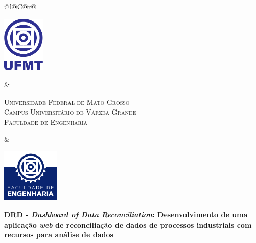 %
%

\begin{titlepage}

\begin{center}

\small

\begin{tabularx}{\linewidth}{@{}l@{}C@{}r@{}}
\parbox[c]{2cm}{\includegraphics[width=2cm]{pre-textuais/figuras/ufmt}} &
\begin{center}
\textsf{\textsc{Universidade Federal de Mato Grosso\\
Campus Universitário de Várzea Grande\\
Faculdade de Engenharia}}
\end{center} &
\parbox[c]{2cm}{\includegraphics[width=2.75cm]{pre-textuais/figuras/faeng}}
\end{tabularx}

\vfill

\LARGE

\textbf{DRD - \textit{Dashboard of Data Reconciliation}: Desenvolvimento de uma aplicação \textit{web} de reconciliação de dados de processos industriais com recursos para análise de dados}

\vfill

\Large


\end{center}
\end{titlepage}
